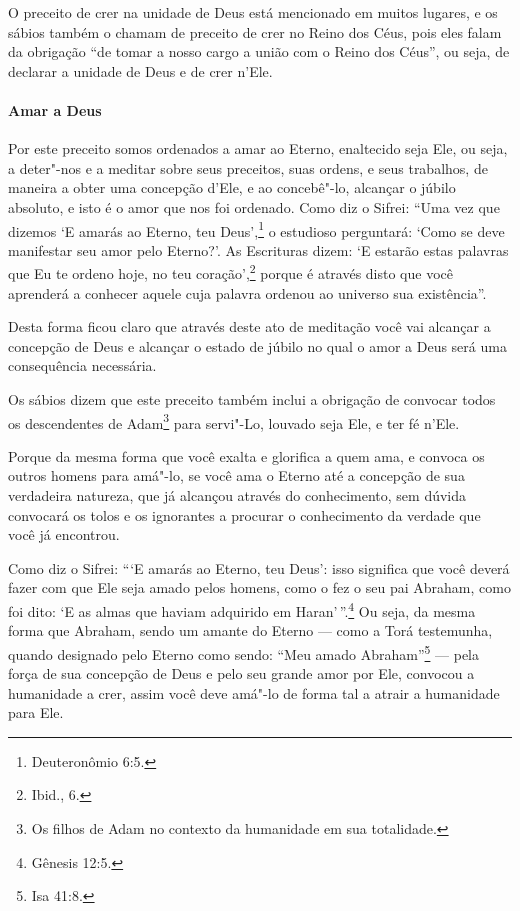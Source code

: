 \begin{multicols}{2}
O preceito de crer na unidade de Deus está mencionado em muitos lugares,
e os sábios também o chamam de preceito de crer no Reino dos Céus,
pois eles falam da obrigação ``de tomar a nosso cargo a união com o
Reino dos Céus'', ou seja, de declarar a unidade de Deus e de crer
n'Ele.

\paragraph{Amar a Deus}

Por este preceito somos ordenados a amar ao Eterno, enaltecido seja
Ele, ou seja, a deter"-nos e a meditar sobre seus preceitos, suas ordens,
e seus trabalhos, de maneira a obter uma concepção d'Ele, e ao
concebê"-lo, alcançar o júbilo absoluto, e isto é o amor que nos foi
ordenado. Como diz o Sifrei\starr: ``Uma vez que dizemos `E amarás ao Eterno,
teu Deus',\footnote{Deuteronômio 6:5.} o estudioso perguntará: `Como se deve
manifestar seu amor pelo Eterno?'. As Escrituras dizem: `E estarão
estas palavras que Eu te ordeno hoje, no teu coração',\footnote{Ibid., 6.} porque é através disto que você aprenderá a conhecer aquele cuja
palavra ordenou ao universo sua existência''.

Desta forma ficou claro que através deste ato de meditação você vai
alcançar a concepção de Deus e alcançar o estado de júbilo no qual o
amor a Deus será uma consequência necessária.

Os sábios dizem que este preceito também inclui a obrigação de convocar todos os descendentes de Adam\footnote{Os filhos de Adam no contexto da humanidade em sua totalidade.} para servi"-Lo, louvado seja Ele, e ter fé n'Ele. 

Porque da mesma forma que você exalta e glorifica a
quem ama, e convoca os outros homens para amá"-lo, se você ama o Eterno
até a concepção de sua verdadeira natureza, que já alcançou através do
conhecimento, sem dúvida convocará os tolos e os ignorantes a procurar
o conhecimento da verdade que você já encontrou.

Como diz o Sifrei\starr: ```E amarás ao Eterno, teu Deus': isso significa que
você deverá fazer com que Ele seja amado pelos homens, como o fez o seu
pai Abraham, como foi dito: `E as almas que haviam adquirido em Haran\starr'\,''.\footnote{Gênesis 12:5.} Ou seja, da mesma forma que Abraham, sendo um amante do Eterno --- como a Torá\starr{} testemunha, quando designado pelo Eterno como
sendo: ``Meu amado Abraham''\footnote{Isa 41:8.} --- pela força de sua
concepção de Deus e pelo seu grande amor por Ele, convocou a humanidade a crer, assim você deve amá"-lo de forma tal a atrair a humanidade para Ele.


\end{multicols}
